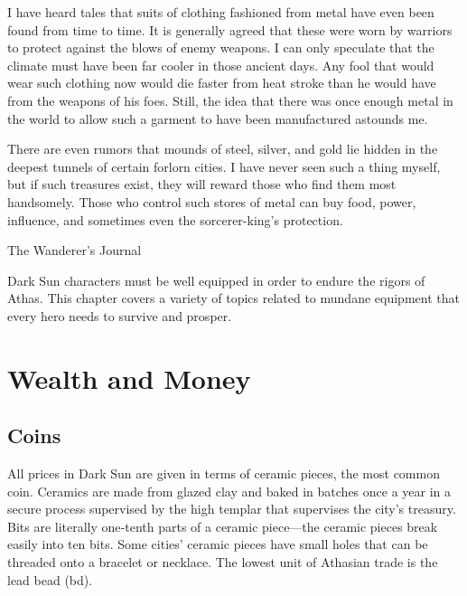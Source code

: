 {I have heard tales that suits of clothing fashioned from metal have even been found from time to time. It is generally agreed that these were worn by warriors to protect against the blows of enemy weapons. I can only speculate that the climate must have been far cooler in those ancient days. Any fool that would wear such clothing now would die faster from heat stroke than he would have from the weapons of his foes. Still, the idea that there was once enough metal in the world to allow such a garment to have been manufactured astounds me.

There are even rumors that mounds of steel, silver, and gold lie hidden in the deepest tunnels of certain forlorn cities. I have never seen such a thing myself, but if such treasures exist, they will reward those who find them most handsomely. Those who control such stores of metal can buy food, power, influence, and sometimes even the sorcerer-king's protection.}
{The Wanderer's Journal}

Dark Sun characters must be well equipped in order to endure the rigors of Athas. This chapter covers a variety of topics related to mundane equipment that every hero needs to survive and prosper.


\section{Wealth and Money}
\subsection{Coins}
All prices in Dark Sun are given in terms of ceramic pieces, the most common coin. Ceramics are made from glazed clay and baked in batches once a year in a secure process supervised by the high templar that supervises the city's treasury. Bits are literally one‐tenth parts of a ceramic piece---the ceramic pieces break easily into ten bits. Some cities' ceramic pieces have small holes that can be threaded onto a bracelet or necklace. The lowest unit of Athasian trade is the lead bead (bd).


